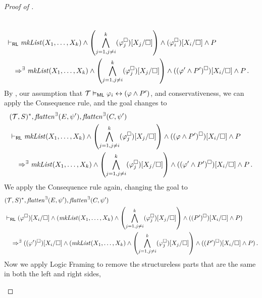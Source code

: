 \begin{proof}[Proof of ]
\begin{enumerate}
\begin{align*}
        \\& \vdash_{\mathsf{RL}}
        \mathit{mkList}(X_1, \ldots, X_k) \land \left( \bigwedge_{j=1,j\not = i}^{k} (\varphi_j^\square)[X_j/\square] \right)
        \land (\varphi_i^\square)[X_i/\square] \land P
        \\&\quad \Rightarrow^\exists
        \mathit{mkList}(X_1, \ldots, X_k) \land \left( \bigwedge_{j=1, j \not = i}^{k} (\varphi_j^\square)[X_j/\square] \right) \land ((\varphi^\prime \land P^\prime)^\square)[X_i/\square] \land P
        \, .
    \end{align*}
    By , our assumption that $\mathcal{T} \vDash_{\mathsf{ML}} \varphi_i \leftrightarrow (\varphi \land P^\prime)$,
    and conservativeness,
    we can apply the Consequence rule, and the goal changes to
    \begin{align*}
        & (\mathcal{T}, S)^*, \mathit{flatten}^\exists(E, \psi^\prime), \mathit{flatten}^\exists(C, \psi^\prime)
        \\& \vdash_{\mathsf{RL}}
        \mathit{mkList}(X_1, \ldots, X_k) \land \left( \bigwedge_{j=1,j\not = i}^{k} (\varphi_j^\square)[X_j/\square] \right)
        \land ((\varphi \land P^\prime)^\square)[X_i/\square] \land P
        \\&\quad \Rightarrow^\exists
        \mathit{mkList}(X_1, \ldots, X_k) \land \left( \bigwedge_{j=1, j \not = i}^{k} (\varphi_j^\square)[X_j/\square] \right) \land ((\varphi^\prime \land P^\prime)^\square)[X_i/\square] \land P
        \, .
    \end{align*}
    We apply the Consequence rule again, changing the goal to
    \begin{align*}
        & (\mathcal{T}, S)^*, \mathit{flatten}^\exists(E, \psi^\prime), \mathit{flatten}^\exists(C, \psi^\prime)
        \\& \vdash_{\mathsf{RL}}
        (\varphi^\square)[X_i/\square] \land (
        \mathit{mkList}(X_1, \ldots, X_k) \land \left( \bigwedge_{j=1,j\not = i}^{k} (\varphi_j^\square)[X_j/\square] \right)
        \land ((P^\prime)^\square)[X_i/\square] \land P)
        \\&\quad \Rightarrow^\exists
        ((\varphi^\prime)^\square)[X_i/\square] \land (
        \mathit{mkList}(X_1, \ldots, X_k) \land \left( \bigwedge_{j=1, j \not = i}^{k} (\varphi_j^\square)[X_j/\square] \right) \land ((P^\prime)^\square)[X_i/\square] \land P)
        \, .
    \end{align*}
    Now we apply Logic Framing to remove the structureless parts that are the same in both the left and right sides,

\end{enumerate}
\end{proof}
